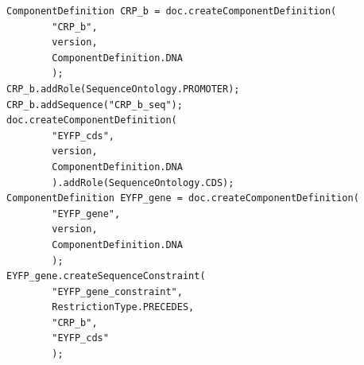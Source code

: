 \vspace{\abovedisplayskip}
\begin{minipage}{0.95\textwidth}
\begin{lstlisting}
ComponentDefinition CRP_b = doc.createComponentDefinition(
        "CRP_b",
        version, 
        ComponentDefinition.DNA
        );
CRP_b.addRole(SequenceOntology.PROMOTER);
CRP_b.addSequence("CRP_b_seq");
doc.createComponentDefinition(
        "EYFP_cds", 
        version, 
        ComponentDefinition.DNA
        ).addRole(SequenceOntology.CDS);
ComponentDefinition EYFP_gene = doc.createComponentDefinition(
        "EYFP_gene", 
        version, 
        ComponentDefinition.DNA
        );
EYFP_gene.createSequenceConstraint(
        "EYFP_gene_constraint", 
        RestrictionType.PRECEDES, 
        "CRP_b", 
        "EYFP_cds"
        );
\end{lstlisting}
\end{minipage}

